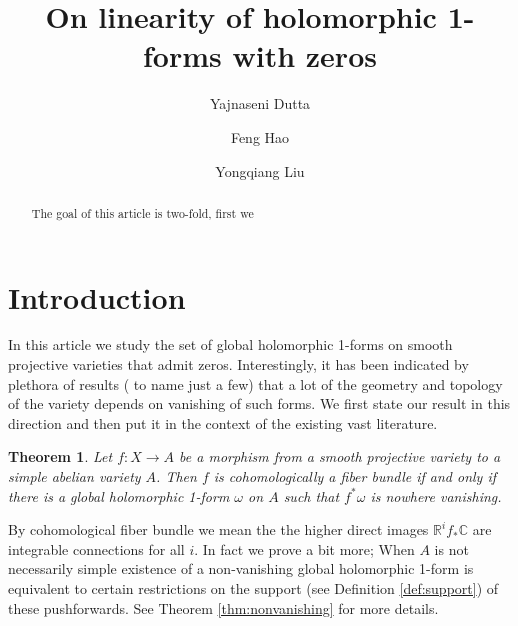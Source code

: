 \documentclass[11pt,reqno]{amsart}
\title{}
\newtheorem{alphtheorem}{Theorem}
\theoremstyle{definition}
\theoremstyle{remark}
\theoremstyle{cited}
\theoremstyle{citeddef}
\newcommand{\bbC}{\mathbb{C}}
\newcommand{\bbR}{\mathbb{R}}
\begin{document}
  
\title[On linearity of holomorphic 1-forms with zeros]{On linearity of holomorphic 1-forms with zeros} 

\author{Yajnaseni Dutta}


\author{Feng Hao}


\author{Yongqiang Liu}






\begin{abstract} 
The goal of this article is two-fold, first we 
\end{abstract}

\maketitle
\section{Introduction}\label{intro}
In this article we study the set of global holomorphic 1-forms  on smooth projective varieties that admit zeros. Interestingly, it has been
indicated by plethora of results (\cite{GL87, HK05, LZ05,
SS19, HS19, PS14} to name just a few) that a lot of the geometry
and topology of the variety depends on vanishing of such forms.
We first state our result in this direction and then put it in the context of 
the existing vast literature.
\begin{alphtheorem}\label{thm:smooth}
Let $f:X\to A$ be a morphism from a smooth projective variety to a simple abelian variety $A$. Then $f$ is cohomologically a fiber bundle if and only if there is a global holomorphic 1-form $\omega	$ on $A$ such that $f^*\omega$ is nowhere vanishing. 
\end{alphtheorem}

By cohomological fiber bundle we mean the the higher direct
images $\bbR^if_*\bbC$ are integrable connections for all $i$. In fact we prove a bit more; When $A$ is not necessarily simple
existence of a non-vanishing global holomorphic 1-form
is equivalent to certain restrictions on the support 
(see Definition \ref{def:support}) of 
these pushforwards. See Theorem \ref{thm:nonvanishing} for more details.
\end{document}
